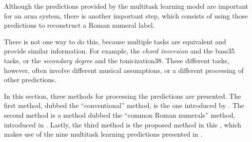 
Although the predictions provided by the multitask learning
model are important for an \gls{arna} system, there is
another important step, which consists of using those
predictions to reconstruct a Roman numeral label.

There is not one way to do this, because multiple tasks are
equivalent and provide similar information. For example, the
\emph{chord inversion} and the \gls{bass35} tasks, or the
\emph{secondary degree} and the \gls{tonicization38}. These
different tasks, however, often involve different musical
assumptions, or a different processing of other predictions.

In this section, three methods for processing the
predictions are presented. The first method, dubbed the
``conventional'' method, is the one introduced by
\textcite{chen2018functional}. The second method is a method
dubbed the ``common Roman numerals'' method, introduced in
\textcite{napoleslopez2021augmentednet}. Lastly, the third
method is the proposed method in this \thesisdiss{}, which
makes use of the nine multitask learning predictions
presented in .










